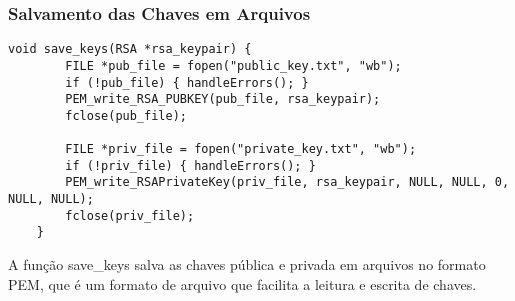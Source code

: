 \documentclass[a4paper,12pt]{article}
\begin{document}
\subsubsection*{Salvamento das Chaves em Arquivos}
\begin{lstlisting}[style=CStyle]
    void save_keys(RSA *rsa_keypair) {
        FILE *pub_file = fopen("public_key.txt", "wb");
        if (!pub_file) { handleErrors(); }
        PEM_write_RSA_PUBKEY(pub_file, rsa_keypair);
        fclose(pub_file);

        FILE *priv_file = fopen("private_key.txt", "wb");
        if (!priv_file) { handleErrors(); }
        PEM_write_RSAPrivateKey(priv_file, rsa_keypair, NULL, NULL, 0, NULL, NULL);
        fclose(priv_file);
    }
\end{lstlisting}
A função save\_keys salva as chaves pública e privada em arquivos no formato PEM, que é um formato de arquivo que facilita a leitura e escrita de chaves.
\end{document}
